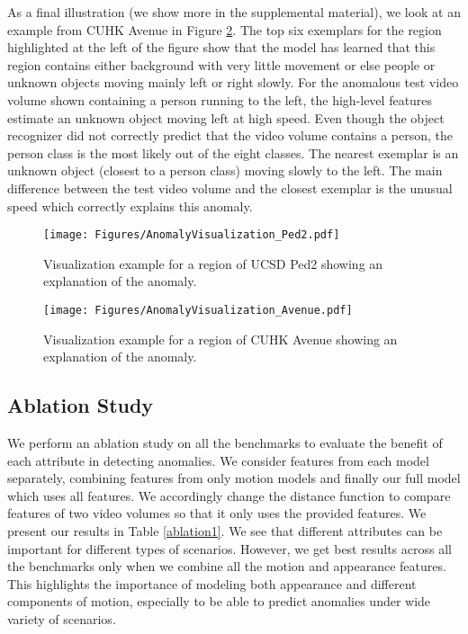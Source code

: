 As a final illustration (we show more in the supplemental material), we look at an example from CUHK Avenue in Figure \ref{fig:visualization_avenue}. 
The top six exemplars for the region highlighted at the left of the figure show that the model has learned that this region contains either background with very little movement or else people or unknown objects moving mainly left or right slowly.  For the anomalous test video volume shown containing a person running to the left, the high-level features estimate an unknown object moving left at high speed.  Even though the object recognizer did not correctly predict that the video volume contains a person, the person class is the most likely out of the eight classes.  The nearest exemplar is an unknown object (closest to a person class) moving slowly to the left.  The main difference between the test video volume and the closest exemplar is the unusual speed which correctly explains this anomaly.

\begin{figure}[tb]
    \centering
    \texttt{[image: Figures/AnomalyVisualization\_Ped2.pdf]}
    \caption{Visualization example for a region of UCSD Ped2 showing an explanation of the anomaly.}
    \label{fig:visualization_ped2}
   \vspace{-10pt}
\end{figure}

\begin{figure}[tb]
    \centering
    \texttt{[image: Figures/AnomalyVisualization\_Avenue.pdf]}
    \caption{Visualization example for a region of CUHK Avenue showing an explanation of the anomaly.}
    \label{fig:visualization_avenue}
\end{figure}
\label{sec:experiments}




\subsection{Ablation Study}
\label{sec:ablation}

We perform an ablation study on all the benchmarks to evaluate the benefit of each attribute in detecting anomalies. We consider features from each model separately, combining features from only motion models and finally our full model which uses all features. We accordingly change the distance function to compare features of two video volumes so that it only uses the provided features. 
We present our results in Table \ref{ablation1}. We see that different attributes can be important for different types of scenarios. However, we get best results across all the benchmarks only when we combine all the motion and appearance features.
This highlights the importance of modeling both appearance and different components of motion, especially to be able to predict anomalies under wide variety of scenarios.

